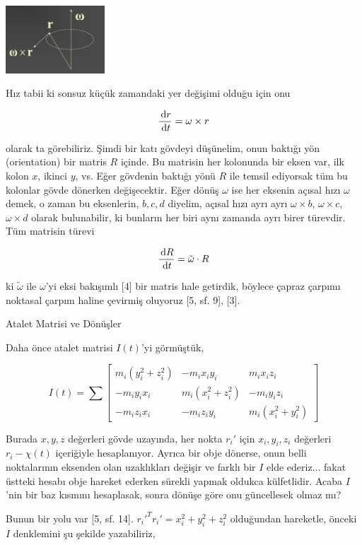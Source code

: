 \documentclass[12pt,fleqn]{article}\usepackage{../../common}
\begin{document}
\includegraphics[width=10em]{phy_005_basics_04_03.png}

Hız tabii ki sonsuz küçük zamandaki yer değişimi olduğu için onu

$$
\frac{\,\mathrm{d} r}{\,\mathrm{d} t} = \omega \times r
$$

olarak ta görebiliriz. Şimdi bir katı gövdeyi düşünelim, onun baktığı yön
(orientation) bir matris $R$ içinde. Bu matrisin her kolonunda bir eksen var,
ilk kolon $x$, ikinci $y$, vs. Eğer gövdenin baktığı yönü $R$ ile temsil
ediyorsak tüm bu kolonlar gövde dönerken değişecektir. Eğer dönüş $\omega$ ise
her eksenin açısal hızı $\omega$ demek, o zaman bu eksenlerin, $b,c,d$ diyelim,
açısal hızı ayrı ayrı $\omega \times b$, $\omega \times c$, $\omega \times d$
olarak bulunabilir, ki bunların her biri aynı zamanda ayrı birer türevdir. Tüm
matrisin türevi

$$
\frac{\,\mathrm{d} R}{\,\mathrm{d} t} = \tilde \omega \cdot R
$$

ki $\tilde \omega$ ile $\omega$'yi eksi bakışımlı [4] bir matris hale getirdik,
böylece çapraz çarpımı noktasal çarpım haline çevirmiş oluyoruz [5, sf. 9], [3].

Atalet Matrisi ve Dönüşler

Daha önce atalet matrisi $I(t)$'yi görmüştük,

$$
I(t) = \sum \left[\begin{array}{ccc}
m_i (y_i^2 + z_i^2) & -m_i x_i y_i & m_i x_i z_i \\
-m_i y_i x_i & m_i (x_i^2 + z_i^2) & -m_i y_i z_i \\
-m_i z_i x_i & -m_i z_i y_i & m_i (x_i^2 + y_i^2)
\end{array}\right]
$$

Burada $x,y,z$ değerleri gövde uzayında, her nokta $r_i'$ için $x_i,y_i,z_i$
değerleri $r_i - \chi(t)$ içeriğiyle hesaplanıyor. Ayrıca bir obje dönerse, onun
belli noktalarının eksenden olan uzaklıkları değişir ve farklı bir $I$ elde
ederiz... fakat üstteki hesabı obje hareket ederken sürekli yapmak oldukca
külfetlidir. Acaba $I$'nin bir baz kısmını hesaplasak, sonra dönüşe göre onu
güncellesek olmaz mı?

Bunun bir yolu var [5, sf. 14]. $r_i'^T r_i' = x_i^2 + y_i^2 + z_i^2$ olduğundan
hareketle, önceki $I$ denklemini şu şekilde yazabiliriz,
\end{document}
